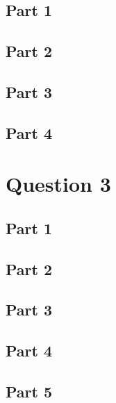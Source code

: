 \documentclass{article}
\begin{document}
\subsection{Part 1}
\subsection{Part 2}
\subsection{Part 3}
\subsection{Part 4}
\section{Question 3}
\subsection{Part 1}
\subsection{Part 2}
\subsection{Part 3}
\subsection{Part 4}
\subsection{Part 5}
\end{document}
